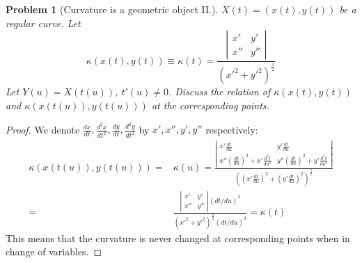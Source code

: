 \documentclass[12pt,a4paper]{article}
\newcounter{theProblemCounter}
\newtheorem{problem}[theProblemCounter]{Problem}
\begin{document}
\begin{problem}[Curvature is a geometric object II.]
$X(t) = (x(t), y(t))$ be a regular curve. Let
\[ \kappa(x(t), y(t)) \equiv \kappa(t) = \frac{
\left|
\begin{array}{cc} x' & y' \\ x'' & y'' \end{array}
\right|
}{(x'^2+y'^2)^\frac32} \]
Let $Y(u) = X(t(u))$, $t'(u)\ne 0$. Discuss the relation of $\kappa(x(t), y(t))$ and $\kappa(x(t(u)), y(t(u)))$ at the corresponding points.
\end{problem}
\begin{proof}
We denote $\frac{dx}{dt}, \frac{d^2x}{dt^2}, \frac{dy}{dt}, \frac{d^2y}{dt^2}$ by $x', x'', y', y''$ respectively:
\begin{align*}
\kappa(x(t(u)), y(t(u))) = & \kappa(u) = \frac{\left|
\begin{array}{cc}
x'\frac{dt}{du} & y'\frac{dt}{du}\\
x''\left(\frac{dt}{du}\right)^2 + x'\frac{d^2t}{du^2} &
y''\left(\frac{dt}{du}\right)^2 + y'\frac{d^2t}{du^2}
\end{array}
\right|}{
\left(\left(x'\frac{dt}{du}\right)^2+\left(y'\frac{dt}{du}\right)^2\right)^\frac32
} \\
= & \frac{
\left|
\begin{array}{cc} x' & y' \\ x'' & y'' \end{array}
\right| (dt/du)^3
}{(x'^2+y'^2)^\frac32 (dt/du)^3} = \kappa(t)
\end{align*}
This means that the curvature is never changed at corresponding points when in change of variables.
\end{proof}
\end{document}
